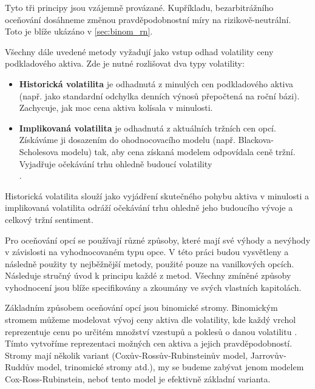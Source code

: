 \documentclass[male,czech,api_bc]{kitheses}
\begin{document}
  Tyto tři principy jsou vzájemně provázané. Kupříkladu, bezarbitrážního oceňování dosáhneme změnou pravděpodobnostní míry na rizikově-neutrální. Toto je blíže ukázáno v \ref{sec:binom_rn}. 

  Všechny dále uvedené metody vyžadují jako vstup odhad volatility ceny podkladového aktiva. Zde je nutné rozlišovat dva typy volatility:
  \begin{itemize}
    \item \textbf{Historická volatilita} je odhadnutá z minulých cen podkladového aktiva (např. jako standardní odchylka denních výnosů přepočtená na roční bázi). Zachycuje, jak moc cena aktiva kolísala v minulosti.
    \item \textbf{Implikovaná volatilita} je odhadnutá z aktuálních tržních cen opcí. Získáváme ji dosazením do ohodnocovacího modelu (např. Blackova-Scholesova modelu) tak, aby cena získaná modelem odpovídala ceně tržní. Vyjadřuje očekávání trhu ohledně budoucí volatility \\ \parencites[kapitola~15.5]{McDonald2013}.
  \end{itemize}

Historická volatilita slouží jako vyjádření skutečného pohybu aktiva v minulosti a implikovaná volatilita odráží očekávání trhu ohledně jeho budoucího vývoje a celkový tržní sentiment. 

  Pro oceňování opcí se používají různé způsoby, které mají své výhody a nevýhody v závislosti na vyhodnocovaném typu opce. V této práci budou vysvětleny a následně použity ty nejběžnější metody, použité pouze na vanilkových opcích. Následuje stručný úvod k principu každé z metod. Všechny zmíněné způsoby vyhodnocení jsou blíže specifikovány a zkoumány ve svých vlastních kapitolách.

  Základním způsobem oceňování opcí jsou binomické stromy. Binomickým stromem můžeme modelovat vývoj ceny aktiva dle volatility, kde každý vrchol reprezentuje cenu po určitém množství vzestupů a poklesů o danou volatilitu \parencites[kapitola 13]{McDonald2013}. Tímto vytvoříme reprezentaci možných cen aktiva a jejich pravděpodobností. Stromy mají několik variant (Coxův-Rossův-Rubinsteinův model, Jarrovův-Ruddův model, trinomické stromy atd.), my se budeme zabývat jenom modelem Cox-Ross-Rubinstein, neboť tento model je efektivně základní varianta.
\end{document}

